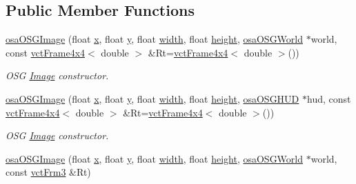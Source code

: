 \subsection*{Public Member Functions}
\begin{DoxyCompactItemize}
\item 
\hyperlink{classosa_o_s_g_image_ad68c98aa678b7e6dc4aa513f3cc872ad}{osa\-O\-S\-G\-Image} (float \hyperlink{classosa_o_s_g_image_a44d3e5d8face9e82282a356e4c4c3332}{x}, float \hyperlink{classosa_o_s_g_image_a6bee81116bbd53706ad648f61b74fc64}{y}, float \hyperlink{classosa_o_s_g_image_a9ba055113d2bcc4ec78db305f16fef4d}{width}, float \hyperlink{classosa_o_s_g_image_aaec6b37a20e1855336360b1825f7b4a6}{height}, \hyperlink{classosa_o_s_g_world}{osa\-O\-S\-G\-World} $\ast$world, const \hyperlink{classvct_frame4x4}{vct\-Frame4x4}$<$ double $>$ \&Rt=\hyperlink{classvct_frame4x4}{vct\-Frame4x4}$<$ double $>$())
\begin{DoxyCompactList}\small\item\em O\-S\-G \hyperlink{classosa_o_s_g_image_1_1_image}{Image} constructor. \end{DoxyCompactList}\item 
\hyperlink{classosa_o_s_g_image_a82b09045446070e84f1821b5847dfffe}{osa\-O\-S\-G\-Image} (float \hyperlink{classosa_o_s_g_image_a44d3e5d8face9e82282a356e4c4c3332}{x}, float \hyperlink{classosa_o_s_g_image_a6bee81116bbd53706ad648f61b74fc64}{y}, float \hyperlink{classosa_o_s_g_image_a9ba055113d2bcc4ec78db305f16fef4d}{width}, float \hyperlink{classosa_o_s_g_image_aaec6b37a20e1855336360b1825f7b4a6}{height}, \hyperlink{classosa_o_s_g_h_u_d}{osa\-O\-S\-G\-H\-U\-D} $\ast$hud, const \hyperlink{classvct_frame4x4}{vct\-Frame4x4}$<$ double $>$ \&Rt=\hyperlink{classvct_frame4x4}{vct\-Frame4x4}$<$ double $>$())
\begin{DoxyCompactList}\small\item\em O\-S\-G \hyperlink{classosa_o_s_g_image_1_1_image}{Image} constructor. \end{DoxyCompactList}\item 
\hyperlink{classosa_o_s_g_image_ad65ad3849f4cb3c7f639c1b844f0f833}{osa\-O\-S\-G\-Image} (float \hyperlink{classosa_o_s_g_image_a44d3e5d8face9e82282a356e4c4c3332}{x}, float \hyperlink{classosa_o_s_g_image_a6bee81116bbd53706ad648f61b74fc64}{y}, float \hyperlink{classosa_o_s_g_image_a9ba055113d2bcc4ec78db305f16fef4d}{width}, float \hyperlink{classosa_o_s_g_image_aaec6b37a20e1855336360b1825f7b4a6}{height}, \hyperlink{classosa_o_s_g_world}{osa\-O\-S\-G\-World} $\ast$world, const \hyperlink{vct_transformation_types_8h_a81feda0a02c2d1bc26e5553f409fed20}{vct\-Frm3} \&Rt)

\end{DoxyCompactItemize}
